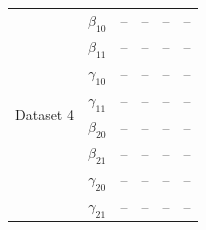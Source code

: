 \begin{table}[!h]
{\begin{tabular}{lccccc}
\midrule
\multirow{8}{*}{Dataset 4} & $\beta_{10}$ & -- & -- & -- & --\\
 & $\beta_{11}$ & -- & -- & -- & --\\
 & $\gamma_{10}$ & -- & -- & -- & --\\
 & $\gamma_{11}$ & -- & -- & -- & --\\
 & $\beta_{20}$ & -- & -- & -- & --\\
 & $\beta_{21}$ & -- & -- & -- & --\\
 & $\gamma_{20}$ & -- & -- & -- & --\\
 & $\gamma_{21}$ & -- & -- & -- & --\\
\bottomrule
\end{tabular}
}
    \label{tab:sim_more}
\end{table}
